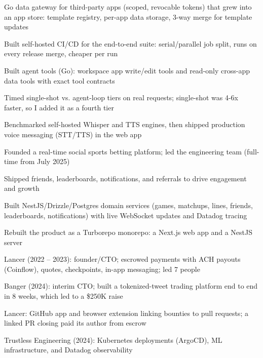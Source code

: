 \documentclass[print]{jack-resume}
\begin{document}
\begin{tightemize}
    \item Go data gateway for third-party apps (scoped, revocable tokens) that grew into an app store: template registry, per-app data storage, 3-way merge for template updates
    \item Built self-hosted CI/CD for the end-to-end suite: serial/parallel job split, runs on every release merge, cheaper per run
    \item Built agent tools (Go): workspace app write/edit tools and read-only cross-app data tools with exact tool contracts
    \item Timed single-shot vs. agent-loop tiers on real requests; single-shot was 4-6x faster, so I added it as a fourth tier
    \item Benchmarked self-hosted Whisper and TTS engines, then shipped production voice messaging (STT/TTS) in the web app
\end{tightemize}
\sectionsep

\begin{tightemize}
    \item Founded a real-time social sports betting platform; led the engineering team (full-time from July 2025)
    \item Shipped friends, leaderboards, notifications, and referrals to drive engagement and growth
    \item Built NestJS/Drizzle/Postgres domain services (games, matchups, lines, friends, leaderboards, notifications) with live WebSocket updates and Datadog tracing
    \item Rebuilt the product as a Turborepo monorepo: a Next.js web app and a NestJS server
\end{tightemize}
\sectionsep

\begin{tightemize}
    \item Lancer (2022 -- 2023): founder/CTO; escrowed payments with ACH payouts (Coinflow), quotes, checkpoints, in-app messaging; led 7 people
    \item Banger (2024): interim CTO; built a tokenized-tweet trading platform end to end in 8 weeks, which led to a \$250K raise
    \item Lancer: GitHub app and browser extension linking bounties to pull requests; a linked PR closing paid its author from escrow
    \item Trustless Engineering (2024): Kubernetes deployments (ArgoCD), ML infrastructure, and Datadog observability
\end{tightemize}
\sectionsep
\end{document}
